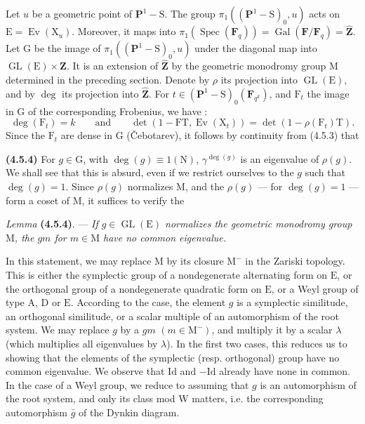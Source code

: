 \documentclass[11pt,leqno]{article}
\begin{document}
Let \(u\) be a geometric point of \(\mathbf{P}^1-\mathrm{S}\). The group \(\pi_1((\mathbf{P}^1-\mathrm{S})_0,u)\) acts on \(\mathrm{E}=\operatorname{Ev}(\mathrm{X}_u)\). Moreover, it maps into \(\pi_1(\operatorname{Spec}(\mathbf{F}_q))=\operatorname{Gal}(\mathbf{F}/\mathbf{F}_q)=\widehat{\mathbf{Z}}\). Let \(\mathrm{G}\) be the image of \(\pi_1((\mathbf{P}^1-\mathrm{S})_0,u)\) under the diagonal map into \(\operatorname{GL}(\mathrm{E})\times\widehat{\mathbf{Z}}\). It is an extension of \(\widehat{\mathbf{Z}}\) by the geometric monodromy group \(\mathrm{M}\) determined in the preceding section. Denote by \(\rho\) its projection into \(\operatorname{GL}(\mathrm{E})\), and by \(\deg\) its projection into \(\widehat{\mathbf{Z}}\). For \(t\in(\mathbf{P}^1-\mathrm{S})_0(\mathbf{F}_{q^k})\), and \(\mathrm{F}_t\) the image in \(\mathrm{G}\) of the corresponding Frobenius, we have :
\[
\deg(\mathrm{F}_t)=k
\qquad\text{and}\qquad
\det(1-\mathrm{F}\mathrm{T},\operatorname{Ev}(\mathrm{X}_t))
=\det(1-\rho(\mathrm{F}_t)\mathrm{T}).
\]
Since the \(\mathrm{F}_t\) are dense in \(\mathrm{G}\) (\v{C}ebotarev), it follows by continuity from (4.5.3) that

\textbf{(4.5.4)} For \(g\in\mathrm{G}\), with \(\deg(g)\equiv1(\mathrm{N})\), \(\gamma^{\deg(g)}\) is an eigenvalue of \(\rho(g)\). We shall see that this is absurd, even if we restrict ourselves to the \(g\) such that \(\deg(g)=1\). Since \(\rho(g)\) normalizes \(\mathrm{M}\), and the \(\rho(g)\) — for \(\deg(g)=1\) — form a coset of \(\mathrm{M}\), it suffices to verify the

\textit{Lemma} \textbf{(4.5.4)}. — \textit{If \(g\in\operatorname{GL}(\mathrm{E})\) normalizes the geometric monodromy group \(\mathrm{M}\), the \(gm\) for \(m\in\mathrm{M}\) have no common eigenvalue.}

In this statement, we may replace \(\mathrm{M}\) by its closure \(\mathrm{M}^{-}\) in the Zariski topology. This is either the symplectic group of a nondegenerate alternating form on \(\mathrm{E}\), or the orthogonal group of a nondegenerate quadratic form on \(\mathrm{E}\), or a Weyl group of type \(\mathrm{A}\), \(\mathrm{D}\) or \(\mathrm{E}\). According to the case, the element \(g\) is a symplectic similitude, an orthogonal similitude, or a scalar multiple of an automorphism of the root system. We may replace \(g\) by a \(gm\) \((m\in\mathrm{M}^{-})\), and multiply it by a scalar \(\lambda\) (which multiplies all eigenvalues by \(\lambda\)). In the first two cases, this reduces us to showing that the elements of the symplectic (resp. orthogonal) group have no common eigenvalue. We observe that \(\mathrm{Id}\) and \(-\mathrm{Id}\) already have none in common. In the case of a Weyl group, we reduce to assuming that \(g\) is an automorphism of the root system, and only its class mod \(\mathrm{W}\) matters, i.e. the corresponding automorphism \(\bar{g}\) of the Dynkin diagram.
\end{document}
